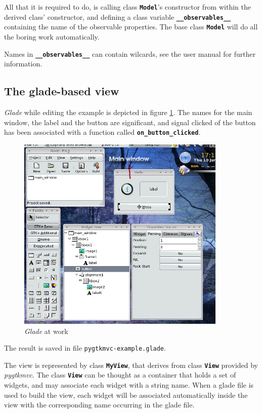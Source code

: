 \documentclass{article}
\newcommand{\kw}[1]{\emph{#1}\xspace}
\newcommand{\appl}[1]{\textsl{#1}\xspace}
\newcommand{\glade}{\appl{Glade}}
\newcommand{\pygtkmvc}{\kw{pygtkmvc}}
\newcommand{\file}[1]{\texttt{#1}\xspace}
\newcommand{\codename}[1]{\texttt{\bfseries \textcolor {codecolor}{#1}}\xspace}
\begin{document}
All that it is required to do, is calling class \codename{Model}'s
constructor from within the derived class' constructor, and
defining a class variable \codename{\_\_observables\_\_} containing
the name of the observable properties. The base class
\codename{Model} will do all the boring work automatically.

Names in \codename{\_\_observables\_\_} can contain wilcards, see
the user manual for further information.

\subsection{The glade-based view}
\glade while editing the example is depicted in figure
\ref{fig:glade}. The names for the main window, the label and the
button are significant, and signal clicked of the button has been
associated with a function called \codename{on\_button\_clicked}.

\begin{figure}[htbp]
\begin{center}
\includegraphics[width=10cm]{png/glade.png}
\caption{\label{fig:glade}\glade at work}
\end{center}
\end{figure}


The result is saved in file \file{pygtkmvc-example.glade}.

The view is represented by class \codename{MyView}, that derives from
class \codename{View} provided by \pygtkmvc. The class \codename{View}
can be thought as a container that holds a set of widgets, and may
associate each widget with a string name. When a glade file is used to
build the view, each widget will be associated automatically inside
the view with the corresponding name occurring in the glade file.
\end{document}
